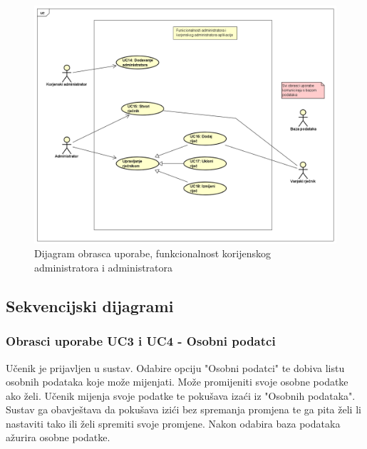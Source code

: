 					\begin{figure}[H]
						\includegraphics[width=\textwidth]{dijagrami/ucdiag2.png} %
						\caption{Dijagram obrasca uporabe, funkcionalnost korijenskog administratora i administratora}
						\label{fig:ucdiag2} %
					\end{figure}

				\eject		
				
			\subsection{Sekvencijski dijagrami}
				
				\subsubsection{Obrasci uporabe UC3 i UC4 - Osobni podatci}
                    Učenik je prijavljen u sustav. Odabire opciju "Osobni podatci" te dobiva listu osobnih podataka koje može mijenjati.
                    Može promijeniti svoje osobne podatke ako želi. Učenik mijenja svoje podatke te pokušava izaći iz "Osobnih podataka".
                    Sustav ga obavještava da pokušava izići bez spremanja promjena te ga pita želi li nastaviti tako ili želi spremiti svoje promjene.
                    Nakon odabira baza podataka ažurira osobne podatke.

